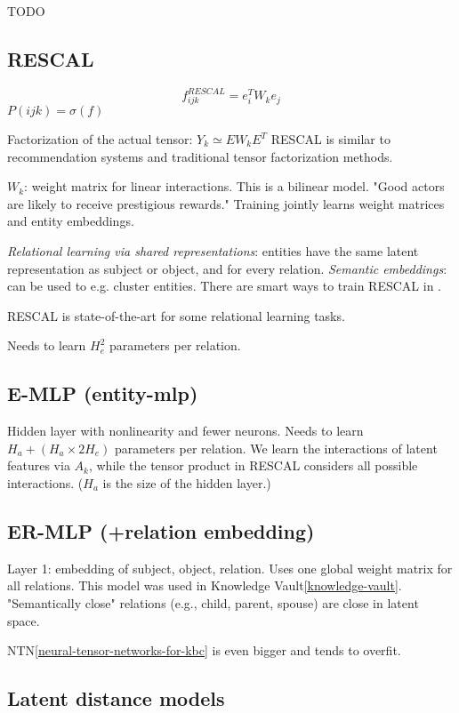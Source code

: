 TODO

\subsection{RESCAL}
\cite{review-of-relational-ml-for-kgs}

$$f_{ijk}^{RESCAL}=e_i^T W_k e_j$$
$P(ijk)=\sigma(f)$

Factorization of the actual tensor: $Y_k \simeq E W_k E^T$
RESCAL is similar to recommendation systems and traditional tensor factorization
methods.

$W_k$: weight matrix for linear interactions.
This is a bilinear model.
"Good actors are likely to receive prestigious rewards."
Training jointly learns weight matrices and entity embeddings.

\textit{Relational learning via shared representations}:
entities have the same latent representation as subject or object, and for every
relation.
\textit{Semantic embeddings}: can be used to e.g. cluster entities.
There are smart ways to train RESCAL in \cite{review-of-relational-ml-for-kgs}.

RESCAL is state-of-the-art for some relational learning tasks.

Needs to learn $H_e^2$ parameters per relation.

\subsection{E-MLP (entity-mlp)}

Hidden layer with nonlinearity and fewer neurons.
Needs to learn $H_a + (H_a \times 2H_e)$ parameters per relation.
We learn the interactions of latent features via $A_k$, while the tensor product
in RESCAL considers all possible interactions.
($H_a$ is the size of the hidden layer.)

\subsection{ER-MLP (+relation embedding)}

Layer 1: embedding of subject, object, relation. Uses one global weight matrix
for all relations. This model was used in Knowledge Vault\ref{knowledge-vault}.
"Semantically close" relations (e.g., child, parent, spouse) are close in latent
space\cite{knowledge-vault}.

NTN\ref{neural-tensor-networks-for-kbc} is even bigger and tends to overfit.

\subsection{Latent distance models}

